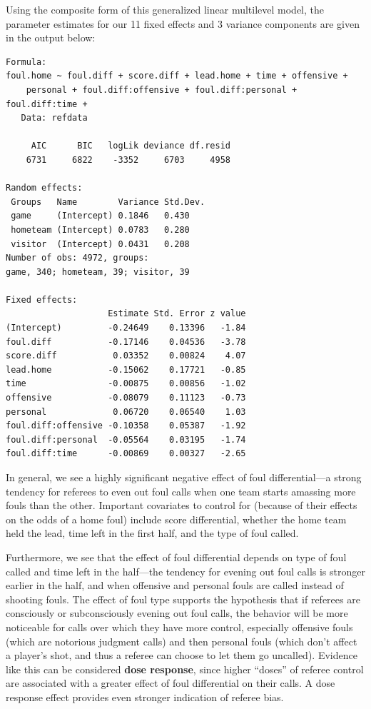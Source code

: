 \documentclass[
]{krantz}
\begin{document}
Using the composite form of this generalized linear multilevel model, the parameter estimates for our 11 fixed effects and 3 variance components are given in the output below:

\begin{verbatim}
Formula: 
foul.home ~ foul.diff + score.diff + lead.home + time + offensive +  
    personal + foul.diff:offensive + foul.diff:personal + foul.diff:time +  
   Data: refdata

     AIC      BIC   logLik deviance df.resid 
    6731     6822    -3352     6703     4958 

Random effects:
 Groups   Name        Variance Std.Dev.
 game     (Intercept) 0.1846   0.430   
 hometeam (Intercept) 0.0783   0.280   
 visitor  (Intercept) 0.0431   0.208   
Number of obs: 4972, groups:  
game, 340; hometeam, 39; visitor, 39

Fixed effects:
                    Estimate Std. Error z value
(Intercept)         -0.24649    0.13396   -1.84
foul.diff           -0.17146    0.04536   -3.78
score.diff           0.03352    0.00824    4.07
lead.home           -0.15062    0.17721   -0.85
time                -0.00875    0.00856   -1.02
offensive           -0.08079    0.11123   -0.73
personal             0.06720    0.06540    1.03
foul.diff:offensive -0.10358    0.05387   -1.92
foul.diff:personal  -0.05564    0.03195   -1.74
foul.diff:time      -0.00869    0.00327   -2.65
\end{verbatim}

In general, we see a highly significant negative effect of foul differential---a strong tendency for referees to even out foul calls when one team starts amassing more fouls than the other. Important covariates to control for (because of their effects on the odds of a home foul) include score differential, whether the home team held the lead, time left in the first half, and the type of foul called.

Furthermore, we see that the effect of foul differential depends on type of foul called and time left in the half---the tendency for evening out foul calls is stronger earlier in the half, and when offensive and personal fouls are called instead of shooting fouls. The effect of foul type supports the hypothesis that if referees are consciously or subconsciously evening out foul calls, the behavior will be more noticeable for calls over which they have more control, especially offensive fouls (which are notorious judgment calls) and then personal fouls (which don't affect a player's shot, and thus a referee can choose to let them go uncalled). Evidence like this can be considered \textbf{dose response}, since higher ``doses'' of referee control are associated with a greater effect of foul differential on their calls. A dose response effect provides even stronger indication of referee bias.
\end{document}
